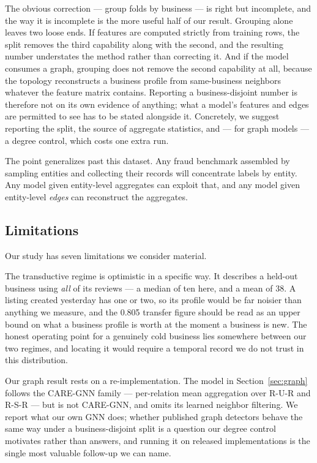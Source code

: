 \documentclass[conference]{IEEEtran}
\begin{document}
The obvious correction --- group folds by business --- is right but incomplete,
and the way it is incomplete is the more useful half of our result. Grouping
alone leaves two loose ends. If features are computed strictly from training
rows, the split removes the third capability along with the second, and the
resulting number understates the method rather than correcting it. And if the
model consumes a graph, grouping does not remove the second capability at all,
because the topology reconstructs a business profile from same-business
neighbors whatever the feature matrix contains. Reporting a business-disjoint
number is therefore not on its own evidence of anything; what a model's features
and edges are permitted to see has to be stated alongside it. Concretely, we
suggest reporting the split, the source of aggregate statistics, and --- for
graph models --- a degree control, which costs one extra run.

The point generalizes past this dataset. Any fraud benchmark assembled by
sampling entities and collecting their records will concentrate labels by
entity. Any model given entity-level aggregates can exploit that, and any model
given entity-level \textit{edges} can reconstruct the aggregates.

\subsection{Limitations}

Our study has seven limitations we consider material.

The transductive regime is optimistic in a specific way. It describes a
held-out business using \textit{all} of its reviews --- a median of ten here,
and a mean of 38. A listing created yesterday has one or two, so its profile
would be far noisier than anything we measure, and the 0.805 transfer figure
should be
read as an upper bound on what a business profile is worth at the moment a
business is new. The honest operating point for a genuinely cold business lies
somewhere between our two regimes, and locating it would require a temporal
record we do not trust in this distribution.

Our graph result rests on a re-implementation. The model in
Section~\ref{sec:graph} follows the CARE-GNN family --- per-relation mean
aggregation over R-U-R and R-S-R --- but is not CARE-GNN, and omits its
learned neighbor filtering. We report what our own GNN does; whether published
graph detectors behave the same way under a business-disjoint split is a
question our degree control motivates rather than answers, and running it on
released implementations is the single most valuable follow-up we can name.
\end{document}
